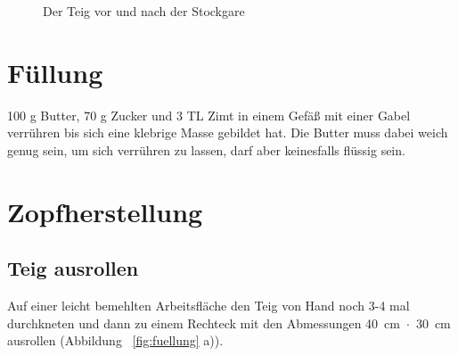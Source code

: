 \documentclass[a4paper, oneside]{recipe}
\begin{document}
\begin{figure}[h]
  \centering
  \quad
  \caption{Der Teig vor und nach der Stockgare}
  \label{fig:vor_nach_stockgare}
\end{figure}

\section*{Füllung}
100 g Butter, 70 g Zucker und 3 TL Zimt in einem Gefäß mit einer Gabel verrühren bis sich eine klebrige Masse gebildet hat. Die Butter muss dabei weich genug sein, um sich verrühren zu lassen, darf aber keinesfalls flüssig sein.

\section*{Zopfherstellung}
\subsection*{Teig ausrollen}
Auf einer leicht bemehlten Arbeitsfläche den Teig von Hand noch 3-4 mal durchkneten und dann zu einem Rechteck mit den Abmessungen 40~cm~$\cdot$~30~cm ausrollen (Abbildung ~\ref{fig:fuellung} a)).
\end{document}
